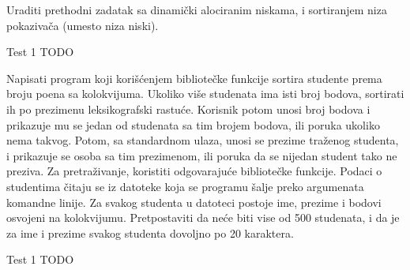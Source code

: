 \begin{Exercise}[label=519]
  Uraditi prethodni zadatak sa dinamički alociranim niskama, i
  sortiranjem niza pokazivača (umesto niza niski).
  
\begin{miditest}
\begin{test}{Test 1}
TODO
\end{test}
\end{miditest}
  
\end{Exercise}

\begin{Exercise}[label=520]
  Napisati program koji korišćenjem bibliotečke funkcije 
  sortira studente prema broju poena sa kolokvijuma. Ukoliko više
  studenata ima isti broj bodova, sortirati ih po prezimenu
  leksikografski rastuće. Korisnik potom unosi broj bodova i prikazuje
  mu se jedan od studenata sa tim brojem bodova, ili poruka ukoliko
  nema takvog. Potom, sa standardnom ulaza, unosi se prezime traženog
  studenta, i prikazuje se osoba sa tim prezimenom, ili poruka da se
  nijedan student tako ne preziva. Za pretraživanje, koristiti
  odgovarajuće bibliotečke funkcije. Podaci o studentima čitaju se iz
  datoteke koja se programu šalje preko argumenata komandne linije. Za
  svakog studenta u datoteci postoje ime, prezime i bodovi osvojeni na
  kolokvijumu. Pretpostaviti da neće biti vise od 500 studenata, i da
  je za ime i prezime svakog studenta dovoljno po 20 karaktera.
  
\begin{miditest}
\begin{test}{Test 1}
TODO
\end{test}
\end{miditest}
  
\end{Exercise}

